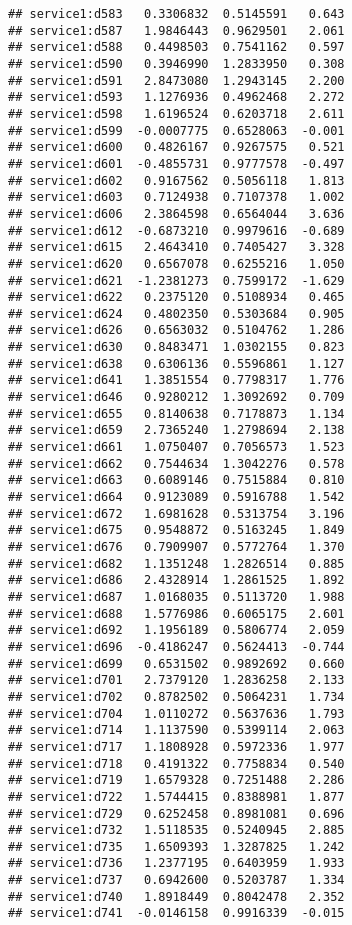 \documentclass[
]{article}
\begin{document}
\begin{verbatim}
## service1:d583   0.3306832  0.5145591   0.643
## service1:d587   1.9846443  0.9629501   2.061
## service1:d588   0.4498503  0.7541162   0.597
## service1:d590   0.3946990  1.2833950   0.308
## service1:d591   2.8473080  1.2943145   2.200
## service1:d593   1.1276936  0.4962468   2.272
## service1:d598   1.6196524  0.6203718   2.611
## service1:d599  -0.0007775  0.6528063  -0.001
## service1:d600   0.4826167  0.9267575   0.521
## service1:d601  -0.4855731  0.9777578  -0.497
## service1:d602   0.9167562  0.5056118   1.813
## service1:d603   0.7124938  0.7107378   1.002
## service1:d606   2.3864598  0.6564044   3.636
## service1:d612  -0.6873210  0.9979616  -0.689
## service1:d615   2.4643410  0.7405427   3.328
## service1:d620   0.6567078  0.6255216   1.050
## service1:d621  -1.2381273  0.7599172  -1.629
## service1:d622   0.2375120  0.5108934   0.465
## service1:d624   0.4802350  0.5303684   0.905
## service1:d626   0.6563032  0.5104762   1.286
## service1:d630   0.8483471  1.0302155   0.823
## service1:d638   0.6306136  0.5596861   1.127
## service1:d641   1.3851554  0.7798317   1.776
## service1:d646   0.9280212  1.3092692   0.709
## service1:d655   0.8140638  0.7178873   1.134
## service1:d659   2.7365240  1.2798694   2.138
## service1:d661   1.0750407  0.7056573   1.523
## service1:d662   0.7544634  1.3042276   0.578
## service1:d663   0.6089146  0.7515884   0.810
## service1:d664   0.9123089  0.5916788   1.542
## service1:d672   1.6981628  0.5313754   3.196
## service1:d675   0.9548872  0.5163245   1.849
## service1:d676   0.7909907  0.5772764   1.370
## service1:d682   1.1351248  1.2826514   0.885
## service1:d686   2.4328914  1.2861525   1.892
## service1:d687   1.0168035  0.5113720   1.988
## service1:d688   1.5776986  0.6065175   2.601
## service1:d692   1.1956189  0.5806774   2.059
## service1:d696  -0.4186247  0.5624413  -0.744
## service1:d699   0.6531502  0.9892692   0.660
## service1:d701   2.7379120  1.2836258   2.133
## service1:d702   0.8782502  0.5064231   1.734
## service1:d704   1.0110272  0.5637636   1.793
## service1:d714   1.1137590  0.5399114   2.063
## service1:d717   1.1808928  0.5972336   1.977
## service1:d718   0.4191322  0.7758834   0.540
## service1:d719   1.6579328  0.7251488   2.286
## service1:d722   1.5744415  0.8388981   1.877
## service1:d729   0.6252458  0.8981081   0.696
## service1:d732   1.5118535  0.5240945   2.885
## service1:d735   1.6509393  1.3287825   1.242
## service1:d736   1.2377195  0.6403959   1.933
## service1:d737   0.6942600  0.5203787   1.334
## service1:d740   1.8918449  0.8042478   2.352
## service1:d741  -0.0146158  0.9916339  -0.015

\end{verbatim}
\end{document}
